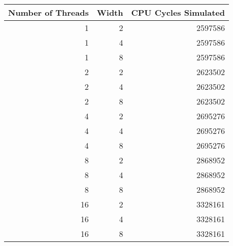\begin{tabular}{rrr}
\hline
   Number of Threads &   Width &   CPU Cycles Simulated \\
\hline
                   1 &       2 &                2597586 \\
                   1 &       4 &                2597586 \\
                   1 &       8 &                2597586 \\
                   2 &       2 &                2623502 \\
                   2 &       4 &                2623502 \\
                   2 &       8 &                2623502 \\
                   4 &       2 &                2695276 \\
                   4 &       4 &                2695276 \\
                   4 &       8 &                2695276 \\
                   8 &       2 &                2868952 \\
                   8 &       4 &                2868952 \\
                   8 &       8 &                2868952 \\
                  16 &       2 &                3328161 \\
                  16 &       4 &                3328161 \\
                  16 &       8 &                3328161 \\
\hline
\end{tabular}